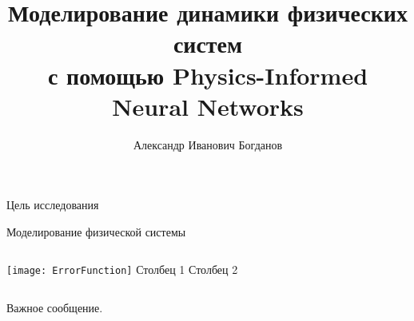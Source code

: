 \documentclass{beamer}
\title[\hbox to 56mm{Моделирование динамики физических систем}]{Моделирование динамики физических систем\\ с помощью Physics-Informed Neural Networks}
\author[А.\,И. Богданов]{Александр Иванович Богданов}
\institute{Московский физико-технический институт}
\date{\footnotesize
\par\smallskip\emph{Курс:} Моя первая научная статья
\par\smallskip\emph{Консультант:} К.\,К.~Панченко
\par\bigskip\small 2023}
\begin{document}

\begin{frame}
\thispagestyle{empty}
\maketitle
\end{frame}


\begin{frame}{Цель исследования}
\end{frame}


\begin{frame}{Моделирование физической системы}

\begin{columns}[c]
\texttt{[image: ErrorFunction]}
    Столбец 1
    Столбец 2
\end{columns}

\bigskip
Важное {\color{red}сообщение}.
\end{frame}
\end{document}
